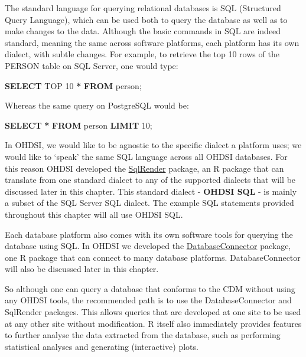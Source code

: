 \documentclass[11pt]{book}
\newenvironment{Shaded}{\begin{snugshade}}{\end{snugshade}}
\newcommand{\DecValTok}[1]{\textcolor[rgb]{0.00,0.00,0.81}{#1}}
\newcommand{\KeywordTok}[1]{\textcolor[rgb]{0.13,0.29,0.53}{\textbf{#1}}}
\newcommand{\NormalTok}[1]{#1}
\newcommand{\OperatorTok}[1]{\textcolor[rgb]{0.81,0.36,0.00}{\textbf{#1}}}
\theoremstyle{definition}
\theoremstyle{definition}
\theoremstyle{definition}
\theoremstyle{remark}
\begin{document}
The standard language for querying relational databases is SQL (Structured Query Language), which can be used both to query the database as well as to make changes to the data. Although the basic commands in SQL are indeed standard, meaning the same across software platforms, each platform has its own dialect, with subtle changes. For example, to retrieve the top 10 rows of the PERSON table on SQL Server, one would type:  

\begin{Shaded}
\begin{Highlighting}[]
\KeywordTok{SELECT}\NormalTok{ TOP }\DecValTok{10} \OperatorTok{*} \KeywordTok{FROM}\NormalTok{ person;}
\end{Highlighting}
\end{Shaded}

Whereas the same query on PostgreSQL would be:

\begin{Shaded}
\begin{Highlighting}[]
\KeywordTok{SELECT} \OperatorTok{*} \KeywordTok{FROM}\NormalTok{ person }\KeywordTok{LIMIT} \DecValTok{10}\NormalTok{;}
\end{Highlighting}
\end{Shaded}

In OHDSI, we would like to be agnostic to the specific dialect a platform uses; we would like to `speak' the same SQL language across all OHDSI databases. For this reason OHDSI developed the \href{https://ohdsi.github.io/SqlRender/}{SqlRender} package, an R package that can translate from one standard dialect to any of the supported dialects that will be discussed later in this chapter. This standard dialect - \textbf{OHDSI SQL} - is mainly a subset of the SQL Server SQL dialect. The example SQL statements provided throughout this chapter will all use OHDSI SQL.    

Each database platform also comes with its own software tools for querying the database using SQL. In OHDSI we developed the \href{https://ohdsi.github.io/DatabaseConnector/}{DatabaseConnector} package, one R package that can connect to many database platforms. DatabaseConnector will also be discussed later in this chapter. 

So although one can query a database that conforms to the CDM without using any OHDSI tools, the recommended path is to use the DatabaseConnector and SqlRender packages. This allows queries that are developed at one site to be used at any other site without modification. R itself also immediately provides features to further analyse the data extracted from the database, such as performing statistical analyses and generating (interactive) plots. 
\end{document}
